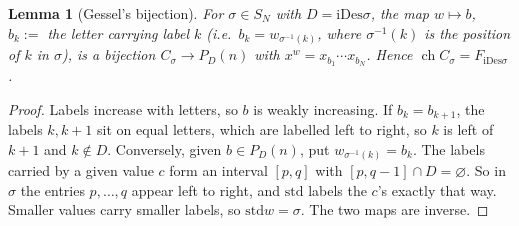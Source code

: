 \documentclass[11pt]{amsart}
\newtheorem{lemma}[theorem]{Lemma}
\theoremstyle{definition}
\theoremstyle{remark}
\newcommand{\std}{\mathrm{std}}
\newcommand{\iDes}{\mathrm{iDes}}
\begin{document}
\begin{lemma}[Gessel's bijection]\label{lem:gessel}
For $\sigma\in S_N$ with $D=\iDes\sigma$, the map $w\mapsto b$, $b_k:=$ the letter carrying label $k$ (i.e.\ $b_k=w_{\sigma^{-1}(k)}$, where $\sigma^{-1}(k)$ is the position of $k$ in $\sigma$), is a bijection $C_\sigma\to P_D(n)$ with $x^w=x_{b_1}\cdots x_{b_N}$. Hence $\operatorname{ch}C_\sigma=F_{\iDes\sigma}$.
\end{lemma}
\begin{proof}
Labels increase with letters, so $b$ is weakly increasing. If $b_k=b_{k+1}$, the labels $k,k+1$ sit on equal letters, which are labelled left to right, so $k$ is left of $k+1$ and $k\notin D$. Conversely, given $b\in P_D(n)$, put $w_{\sigma^{-1}(k)}=b_k$. The labels carried by a given value $c$ form an interval $[p,q]$ with $[p,q-1]\cap D=\varnothing$. So in $\sigma$ the entries $p,\dots,q$ appear left to right, and $\std$ labels the $c$'s exactly that way. Smaller values carry smaller labels, so $\std w=\sigma$. The two maps are inverse.
\end{proof}
\end{document}
